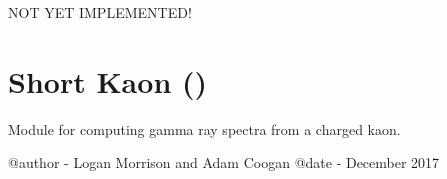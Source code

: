 \documentclass[letterpaper,10pt,english]{sphinxmanual}
\begin{document}

\begin{fulllineitems}
NOT YET IMPLEMENTED!

\end{fulllineitems}



\section{Short Kaon ()}
\label{\detokenize{modules:short-kaon-hazma-short-kaon}}\label{\detokenize{modules:module-hazma.charged_kaon}}
Module for computing gamma ray spectra from a charged kaon.

@author - Logan Morrison and Adam Coogan
@date - December 2017
\end{document}
